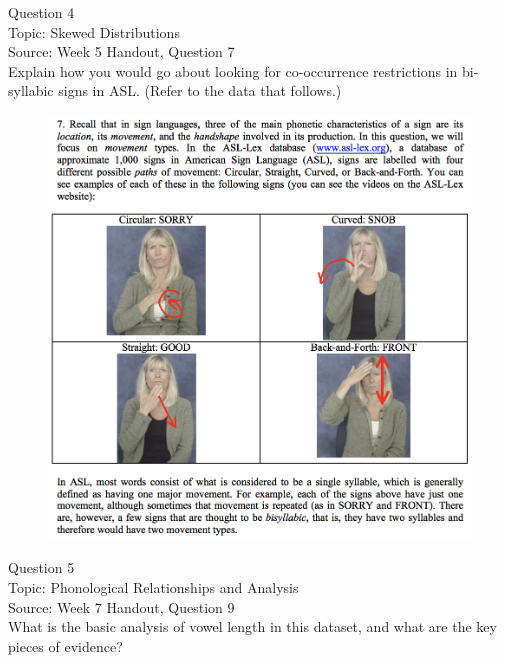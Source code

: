 \documentclass[12pt]{article}
\begin{document}
{\large Question 4}\\

Topic: Skewed Distributions\\
Source: Week 5 Handout, Question 7\\

Explain how you would go about looking for co-occurrence restrictions in bi-syllabic signs in ASL. (Refer to the data that follows.)\\

\begin{figure}[H]
\includegraphics{../images/ASL_movement.png}
\end{figure}

\newpage

{\large Question 5}\\

Topic: Phonological Relationships and Analysis\\
Source: Week 7 Handout, Question 9\\

What is the basic analysis of vowel length in this dataset, and what are the key pieces of evidence?\\
\end{document}
